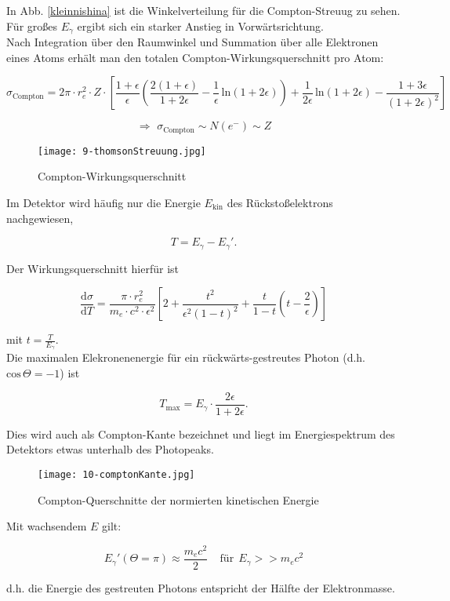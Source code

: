 In Abb. \ref{kleinnishina} ist die Winkelverteilung für die Compton-Streuug zu sehen. Für großes
$E_\gamma$ ergibt sich ein starker Anstieg in Vorwärtsrichtung.
\\
Nach Integration über den Raumwinkel und Summation über alle Elektronen eines Atoms erhält man den
totalen Compton-Wirkungsquerschnitt pro Atom:

\[\sigma_{\text{Compton}} = 2\pi \cdot r_e^2\cdot Z \cdot
\left[\frac{1+\epsilon}{\epsilon}\left( \frac{2(1+\epsilon)}{1+2\epsilon} -
\frac{1}{\epsilon}\,\text{ln}(1+2\epsilon) \right) + \frac{1}{2\epsilon}\,\text{ln}(1+2\epsilon) -
\frac{1+3\epsilon}{(1+2\epsilon)^2} \right] \]

\[\Rightarrow\,\, \sigma_{\text{Compton}} \sim N(e^-) \sim Z  \]

\begin{figure}[H]
	\centering
	\texttt{[image: 9-thomsonStreuung.jpg]}
	\caption{Compton-Wirkungsquerschnitt}
	\label{comptonwq}
\end{figure}

Im Detektor wird häufig nur die Energie $E_{\text{kin}}$ des Rückstoßelektrons nachgewiesen,

\[T= E_\gamma -E_\gamma'.  \]

Der Wirkungsquerschnitt hierfür ist

\[\frac{\mathrm{d}\sigma}{\mathrm{d}T} = \frac{\pi\cdot r_e^2}{m_e\cdot c^2\cdot \epsilon^2} \left[
2+ \frac{t^2}{\epsilon^2(1-t)^2} +\frac{t}{1-t}\left(t-\frac{2}{\epsilon} \right) \right] \]

mit $t=\frac{T}{E_\gamma}$.
\\
Die maximalen Elekronenenergie für ein rückwärts-gestreutes Photon (d.h. $\text{cos}\,\Theta=-1$)
ist

\[T_{\text{max}} = E_\gamma\cdot \frac{2\epsilon}{1+2\epsilon}. \] 

Dies wird auch als Compton-Kante bezeichnet und liegt im Energiespektrum des Detektors etwas
unterhalb des Photopeaks.

\begin{figure}[H]
	\centering
	\texttt{[image: 10-comptonKante.jpg]}
	\caption{Compton-Querschnitte der normierten kinetischen Energie}
	\label{comptonTmax}
\end{figure}

Mit wachsendem $E$ gilt:

\[E_\gamma'(\Theta=\pi) \approx \frac{m_ec^2}{2}~~~~~\text{für}~~E_\gamma>>m_ec^2  \]

d.h. die Energie des gestreuten Photons entspricht der Hälfte der Elektronmasse.